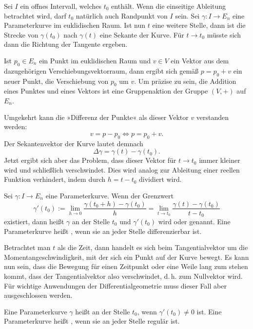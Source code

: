 Sei $I$ ein offnes Intervall, welches $t_0$ enthält. Wenn die einseitige
Ableitung betrachtet wird, darf $t_0$ natürlich auch Randpunkt von $I$
sein. Sei $\gamma\colon I\to E_n$ eine Parameterkurve im euklidischen
Raum. Ist nun $t$ eine weitere Stelle, dann ist die Strecke von
$\gamma(t_0)$ nach $\gamma(t)$ eine Sekante der Kurve. Für $t\to t_0$
müsste sich dann die Richtung der Tangente ergeben.

Ist $p_0\in E_n$ ein Punkt im euklidischen Raum und $v\in V$ ein Vektor
aus dem dazugehörigen Verschiebungsvektorraum, dann ergibt sich
gemäß $p=p_0+v$ ein neuer Punkt, die Verschiebung von $p_0$ um $v$.
Um präzise zu sein, die Addition eines Punktes und eines Vektors ist
eine Gruppenaktion der Gruppe $(V,+)$ auf $E_n$. 

Umgekehrt kann die »Differenz der Punkte« als dieser Vektor $v$
verstanden werden:%
\begin{equation}
v = p-p_0 \iff p = p_0+v.
\end{equation}
Der Sekantenvektor der Kurve lautet demnach
\begin{equation}
\Delta\gamma = \gamma(t)-\gamma(t_0).
\end{equation}
Jetzt ergibt sich aber das Problem, dass dieser Vektor für $t\to t_0$
immer kleiner wird und schließlich verschwindet. Dies wird analog
zur Ableitung einer reellen Funktion verhindert, indem durch $h=t-t_0$
dividiert wird.
\begin{definition}%
\label{diff-Parameterkurve}
Sei $\gamma\colon I\to E_n$ eine Parameterkurve. Wenn der Grenzwert
\begin{equation}
\gamma'(t_0) := \lim_{h\to 0} \frac{\gamma(t_0+h)-\gamma(t_0)}{h}
= \lim_{t\to t_0} \frac{\gamma(t)-\gamma(t_0)}{t-t_0}
\end{equation}
existiert, dann heißt $\gamma$ an der Stelle $t_0$
 und $\gamma'(t_0)$ wird 
oder  genannt. Eine Parameterkurve heißt
, wenn sie an jeder Stelle differenzierbar ist.
\end{definition}
Betrachtet man $t$ als die Zeit, dann handelt es sich beim
Tangentialvektor um die Momentangeschwindigkeit, mit der sich ein
Punkt auf der Kurve bewegt. Es kann nun sein, dass die Bewegung für
einen Zeitpunkt oder eine Weile lang zum stehen kommt, dass der
Tangentialvektor also verschwindet, d.\,h. zum Nullvektor wird.
Für wichtige Anwendungen der Differentialgeometrie muss dieser
Fall aber ausgeschlossen werden.
\begin{definition}
Eine Parameterkurve $\gamma$ heißt  an der Stelle $t_0$,
wenn $\gamma'(t_0)\ne 0$ ist. Eine Parameterkurve heißt ,
wenn sie an jeder Stelle regulär ist.
\end{definition}


